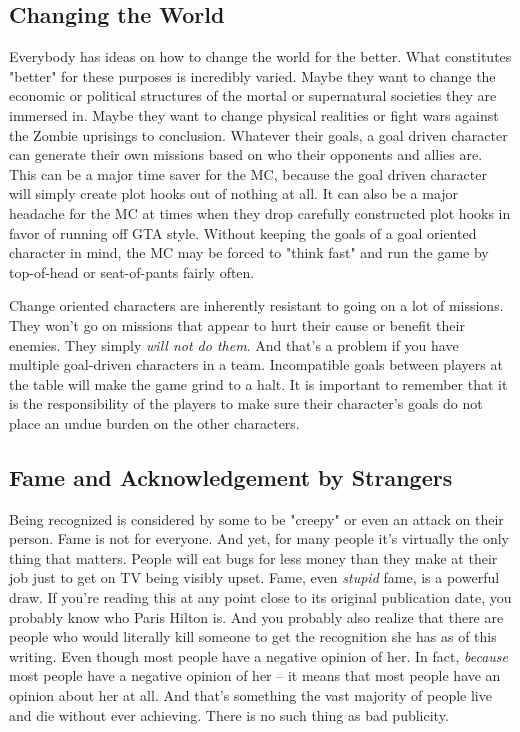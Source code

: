 \subsection{Changing the World}

Everybody has ideas on how to change the world for the better. What constitutes "better" for these purposes is incredibly varied. Maybe they want to change the economic or political structures of the mortal or supernatural societies they are immersed in. Maybe they want to change physical realities or fight wars against the Zombie uprisings to conclusion. Whatever their goals, a goal driven character can  generate their own missions based on who their opponents and allies are. This can be a major time saver for the MC, because the goal driven character will simply create plot hooks out of nothing at all. It can also be a major headache for the MC at times when they drop carefully constructed plot hooks in favor of running off GTA style. Without keeping the goals of a goal oriented character in mind, the MC may be forced to "think fast" and run the game by top-of-head or seat-of-pants fairly often.

Change oriented characters are inherently resistant to going on a lot of missions. They won't go on missions that appear to hurt their cause or benefit their enemies. They simply \textit{will not do them}. And that's a problem if you have multiple goal-driven characters in a team. Incompatible goals between players at the table will make the game grind to a halt. It is important to remember that it is the responsibility of the players to make sure their character's goals do not place an undue burden on the other characters.

\subsection[Fame]{Fame and Acknowledgement by Strangers}

Being recognized is considered by some to be "creepy" or even an attack on their person. Fame is not for everyone. And yet, for many people it's virtually the only thing that matters. People will eat bugs for less money than they make at their job just to get on TV being visibly upset. Fame, even \textit{stupid} fame, is a powerful draw. If you're reading this at any point close to its original publication date, you probably know who Paris Hilton is. And you probably also realize that there are people who would literally kill someone to get the recognition she has as of this writing. Even though most people have a negative opinion of her. In fact, \textit{because} most people have a negative opinion of her -- it means that most people have an opinion about her at all. And that's something the vast majority of people live and die without ever achieving. There is no such thing as bad publicity.

